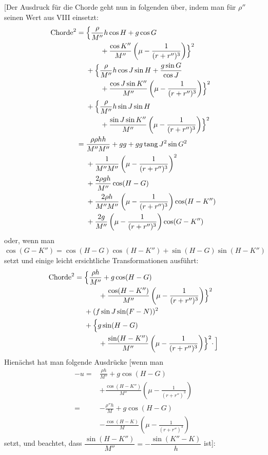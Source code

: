 [Der Ausdruck für die Chorde geht nun in folgenden über, indem man für \(\rho''\) seinen Wert aus VIII einsetzt:
\[
\begin{aligned}
\text{Chorde}^2={}&\Bigl\{\frac{\rho}{M''}h\cos H+g\cos G\\
&\qquad{}+\frac{\cos K''}{M''}\left(\mu-\frac{1}{(r+r'')^3}\right)\Bigr\}^2\\
&+\Bigl\{\frac{\rho}{M''}h\cos J\sin H+\frac{g\sin G}{\cos J}\\
&\qquad{}+\frac{\cos J\sin K''}{M''}\left(\mu-\frac{1}{(r+r'')^3}\right)\Bigr\}^2\\
&+\Bigl\{\frac{\rho}{M''}h\sin J\sin H\\
&\qquad{}+\frac{\sin J\sin K''}{M''}\left(\mu-\frac{1}{(r+r'')^3}\right)\Bigr\}^2\\
={}&\frac{\rho\rho hh}{M''M''}+gg+gg\operatorname{tang}J^2\sin G^2\\
&+\frac{1}{M''M''}\left(\mu-\frac{1}{(r+r'')^3}\right)^2\\
&+\frac{2\rho gh}{M''}\cos(H-G)\\
&+\frac{2\rho h}{M''M''}\left(\mu-\frac{1}{(r+r'')^3}\right)\cos(H-K'')\\
&+\frac{2g}{M''}\left(\mu-\frac{1}{(r+r'')^3}\right)\cos(G-K'')
\end{aligned}
\]
oder, wenn man \(\cos(G-K'')=\cos(H-G)\cos(H-K'')+\sin(H-G)\sin(H-K'')\) setzt und einige leicht ersichtliche Transformationen ausführt:
\[
\begin{aligned}
\text{Chorde}^2={}&\Bigl\{\frac{\rho h}{M''}+g\cos(H-G)\\
&\qquad{}+\frac{\cos(H-K'')}{M''}\left(\mu-\frac{1}{(r+r'')^3}\right)\Bigr\}^2\\
&+(f\sin J\sin(F-N))^2\\
&+\Bigl\{g\sin(H-G)\\
&\qquad{}+\frac{\sin(H-K'')}{M''}\left(\mu-\frac{1}{(r+r'')^3}\right)\Bigr\}^2\mathpunct{\cdot}\Bigr]
\end{aligned}
\]
Hienächst hat man folgende Ausdrücke [wenn man
\[
\begin{aligned}
-u={}&\frac{\rho h}{M''}+g\cos(H-G)\\
&+\frac{\cos(H-K'')}{M''}\left(\mu-\frac{1}{(r+r'')^3}\right)\\
={}&-\frac{\rho''h}{M}+g\cos(H-G)\\
&-\frac{\cos(H-K)}{M}\left(\mu-\frac{1}{(r+r'')^3}\right)
\end{aligned}
\]
setzt, und beachtet, dass \(\dfrac{\sin(H-K'')}{M''}=-\dfrac{\sin(K''-K)}{h}\) ist]:
